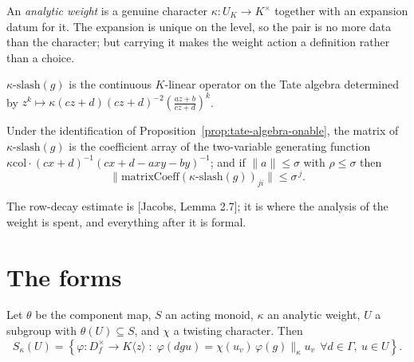 \begin{definition}
  \label{def:analyticweight}
  \leanok
  An \emph{analytic weight} is a genuine character $\kappa : U_K \to K^\times$ together with an
  expansion datum for it.  The expansion is unique on the level, so the pair is no more data than
  the character; but carrying it makes the weight action a definition rather than a choice.
\end{definition}

\begin{definition}
  \label{def:kappaslash}
  \leanok
  $\kappa\text{-}\mathrm{slash}(g)$ is the continuous $K$-linear operator on the Tate algebra
  determined by $z^k \mapsto \kappa(cz+d)(cz+d)^{-2}\left(\frac{az+b}{cz+d}\right)^k$.
\end{definition}

\begin{proposition}
  \label{prop:kappaslash-matrix}
  \leanok
  Under the identification of Proposition~\ref{prop:tate-algebra-onable}, the matrix of
  $\kappa\text{-}\mathrm{slash}(g)$ is the coefficient array of the two-variable generating
  function $\kappa\mathrm{col}\cdot(cx+d)^{-1}(cx+d-axy-by)^{-1}$; and if $\lVert a \rVert \leq
  \sigma$ with $\rho \leq \sigma$ then
  \[
    \lVert \mathrm{matrixCoeff}(\kappa\text{-}\mathrm{slash}(g))_{j i} \rVert \leq \sigma^{\,j}.
  \]
\end{proposition}

The row-decay estimate is [Jacobs, Lemma 2.7]; it is where the analysis of the weight is spent,
and everything after it is formal.

\section{The forms}

\begin{definition}
  \label{def:forms}
  \leanok
  Let $\theta$ be the component map, $S$ an acting monoid, $\kappa$ an analytic weight, $U$ a
  subgroup with $\theta(U) \subseteq S$, and $\chi$ a twisting character.  Then
  \[
    S_\kappa(U) = \left\{ \varphi : D_f^\times \to K\langle z\rangle \;:\; \varphi(dgu) =
    \chi(u_v)\, \varphi(g) \|_\kappa u_v \ \ \forall d \in \Gamma,\ u \in U \right\}.
  \]
\end{definition}

